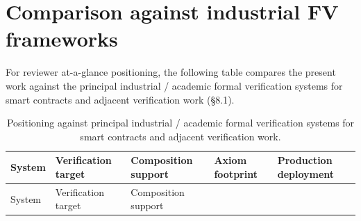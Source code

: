 \section{Comparison against industrial FV
frameworks}\label{comparison-against-industrial-fv-frameworks}

For reviewer at-a-glance positioning, the following table compares the
present work against the principal industrial / academic formal
verification systems for smart contracts and adjacent verification work
(§8.1).

\begin{longtable}[]{@{}
  >{\raggedright\arraybackslash}p{}
  >{\raggedright\arraybackslash}p{}
  >{\raggedright\arraybackslash}p{}
  >{\raggedright\arraybackslash}p{}
  >{\raggedright\arraybackslash}p{}@{}}
\caption{Positioning against principal industrial / academic formal
verification systems for smart contracts and adjacent verification
work.}\tabularnewline
\toprule\noalign{}
\begin{minipage}[b]{\linewidth}\raggedright
System
\end{minipage} & \begin{minipage}[b]{\linewidth}\raggedright
Verification target
\end{minipage} & \begin{minipage}[b]{\linewidth}\raggedright
Composition support
\end{minipage} & \begin{minipage}[b]{\linewidth}\raggedright
Axiom footprint
\end{minipage} & \begin{minipage}[b]{\linewidth}\raggedright
Production deployment
\end{minipage} \\
\midrule\noalign{}
\endfirsthead
\toprule\noalign{}
\begin{minipage}[b]{\linewidth}\raggedright
System
\end{minipage} & \begin{minipage}[b]{\linewidth}\raggedright
Verification target
\end{minipage} & \begin{minipage}[b]{\linewidth}\raggedright
Composition support
\end{minipage} & \begin{minipage}[b]{\linewidth}\raggedright

\end{minipage}
\end{longtable}
